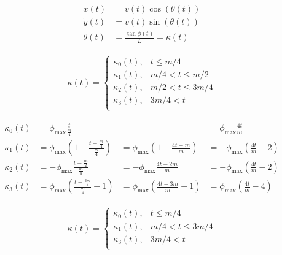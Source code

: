 \documentclass{article}
\begin{document}
\begin{align}
  \dot{x}\left(t\right) &= v\left(t\right)\cos\left(\theta\left(t\right)\right)\\
  \dot{y}\left(t\right) &= v\left(t\right)\sin\left(\theta\left(t\right)\right)\\
  \dot{\theta}\left(t\right) &= \frac{\tan \phi\left(t\right)}{L} = \kappa\left(t\right)
\end{align}

\begin{align}
  \kappa\left(t\right) = \left\{
    \begin{array}{cc}
      \kappa_{0}\left(t\right),   & t \le m/4\\
      \kappa_{1}\left(t\right),   & m/4 < t \le m/2\\
      \kappa_{2}\left(t\right), & m/2 < t \le 3m/4\\
      \kappa_{3}\left(t\right), & 3m/4 < t\\
    \end{array}
  \right.
\end{align}

\begin{align}
  \kappa_{0}\left(t\right) &= \phi_{\max}\frac{t}{\frac{m}{4}} &= &=\phi_{\max}\frac{4t}{m}\\
  \kappa_{1}\left(t\right) &= \phi_{\max}\left(1-\frac{t-\frac{m}{4}}{\frac{m}{4}}\right) &= \phi_{\max}\left(1-\frac{4t-m}{m}\right) &= -\phi_{\max}\left(\frac{4t}{m}-2\right)\\
  \kappa_{2}\left(t\right) &= -\phi_{\max}\frac{t-\frac{m}{2}}{\frac{m}{4}} &= -\phi_{\max}\frac{4t-2m}{m} &= -\phi_{\max}\left(\frac{4t}{m}-2\right)\\
  \kappa_{3}\left(t\right) &= \phi_{\max}\left(\frac{t-\frac{3m}{4}}{\frac{m}{4}}-1\right) &=  \phi_{\max}\left(\frac{4t-3m}{m}-1\right) &= \phi_{\max}\left(\frac{4t}{m}-4\right)
\end{align}

\begin{align}
  \kappa\left(t\right) = \left\{
    \begin{array}{cc}
      \kappa_{0}\left(t\right),   & t \le m/4\\
      \kappa_{1}\left(t\right),   & m/4 < t \le 3m/4\\
      \kappa_{3}\left(t\right), & 3m/4 < t\\
    \end{array}
  \right.
\end{align}
\end{document}
